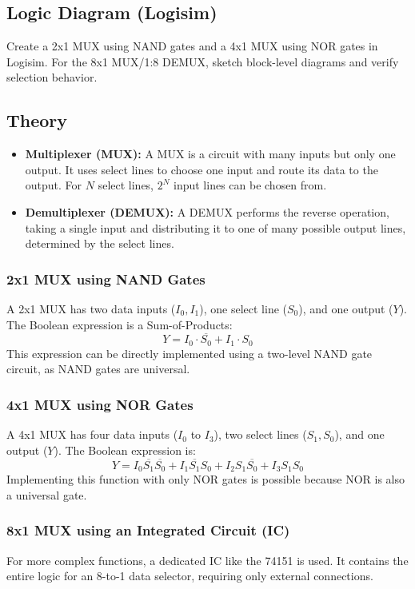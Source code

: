 \documentclass[11pt]{article}
\begin{document}
\subsection{Logic Diagram (Logisim)}
Create a 2x1 MUX using NAND gates and a 4x1 MUX using NOR gates in Logisim. For the 8x1 MUX/1:8 DEMUX, sketch block-level diagrams and verify selection behavior.


\subsection{Theory}
\begin{itemize}
    \item \textbf{Multiplexer (MUX):} A MUX is a circuit with many inputs but only one output. It uses select lines to choose one input and route its data to the output. For $N$ select lines, $2^N$ input lines can be chosen from.
    \item \textbf{Demultiplexer (DEMUX):} A DEMUX performs the reverse operation, taking a single input and distributing it to one of many possible output lines, determined by the select lines.
\end{itemize}

\subsubsection{2x1 MUX using NAND Gates}
A 2x1 MUX has two data inputs ($I_0, I_1$), one select line ($S_0$), and one output ($Y$). The Boolean expression is a Sum-of-Products:
$$ Y = I_0 \cdot \overline{S_0} + I_1 \cdot S_0 $$
This expression can be directly implemented using a two-level NAND gate circuit, as NAND gates are universal.

\subsubsection{4x1 MUX using NOR Gates}
A 4x1 MUX has four data inputs ($I_0$ to $I_3$), two select lines ($S_1, S_0$), and one output ($Y$). The Boolean expression is:
$$ Y = I_0\overline{S_1}\overline{S_0} + I_1\overline{S_1}S_0 + I_2S_1\overline{S_0} + I_3S_1S_0 $$
Implementing this function with only NOR gates is possible because NOR is also a universal gate.

\subsubsection{8x1 MUX using an Integrated Circuit (IC)}
For more complex functions, a dedicated IC like the 74151 is used. It contains the entire logic for an 8-to-1 data selector, requiring only external connections.
\end{document}
